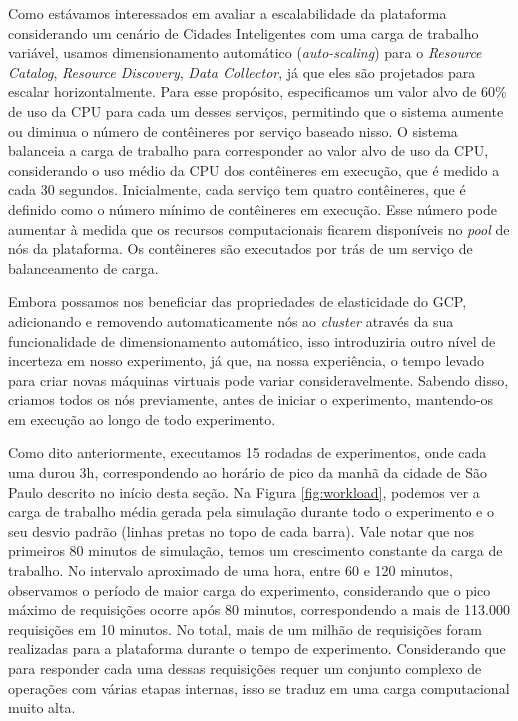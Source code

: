 Como estávamos interessados em avaliar a escalabilidade da plataforma considerando um cenário de Cidades Inteligentes com uma carga de trabalho variável, usamos dimensionamento automático
(\textit{auto-scaling}) para o \textit{Resource Catalog}, \textit{Resource Discovery}, \textit{Data Collector}, já que eles são projetados para escalar horizontalmente.
Para esse propósito, especificamos um valor alvo de 60\% de uso da CPU para cada um desses serviços, permitindo que o sistema aumente ou diminua o número de contêineres por serviço baseado nisso.
O sistema balanceia a carga de trabalho para corresponder ao valor alvo de uso da CPU, considerando o uso médio da CPU dos contêineres em execução, que é medido a cada 30 segundos.
Inicialmente, cada serviço tem quatro contêineres, que é definido como o número mínimo de contêineres em execução.
Esse número pode aumentar à medida que os recursos computacionais ficarem disponíveis no \textit{pool} de nós da plataforma.
Os contêineres são executados por trás de um serviço de balanceamento de carga.

Embora possamos nos beneficiar das propriedades de elasticidade do GCP, adicionando e removendo automaticamente nós ao \textit{cluster} através da sua funcionalidade de dimensionamento automático,
isso introduziria outro nível de incerteza em nosso experimento, já que, na nossa experiência, o tempo levado para criar novas máquinas virtuais pode variar consideravelmente.
Sabendo disso, criamos todos os nós previamente, antes de iniciar o experimento, mantendo-os em execução ao longo de todo experimento.

Como dito anteriormente, executamos 15 rodadas de experimentos, onde cada uma durou 3h, correspondendo ao horário de pico da manhã da cidade de São Paulo descrito no início desta seção.
Na Figura \ref{fig:workload}, podemos ver a carga de trabalho média gerada pela simulação durante todo o experimento e o seu desvio padrão (linhas pretas no topo de cada barra).
Vale notar que nos primeiros 80 minutos de simulação, temos um crescimento constante da carga de trabalho.
No intervalo aproximado de uma hora, entre 60 e 120 minutos, observamos o período de maior carga do experimento, considerando que o pico máximo de requisições ocorre após 80 minutos, correspondendo a mais
de 113.000 requisições em 10 minutos.
No total, mais de um milhão de requisições foram realizadas para a plataforma durante o tempo de experimento.
Considerando que para responder cada uma dessas requisições requer um conjunto complexo de operações com várias etapas internas, isso se traduz em uma carga computacional muito alta.

